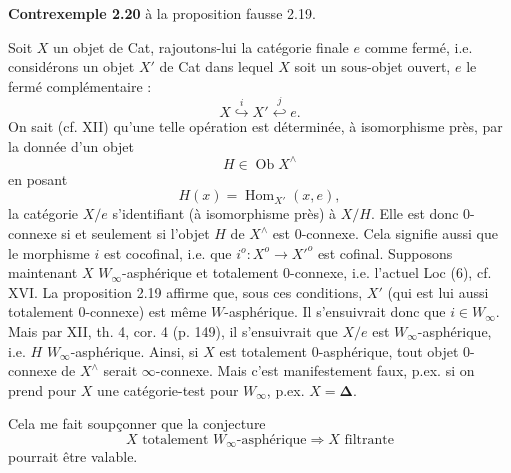 \documentclass[11pt]{article}
\newcommand{\printedpage}[1]{\marginpar{\footnotesize p.~#1}}
\newcommand{\msp}[1]{\marginpar{\footnotesize [#1]}}
\newcommand{\Hom}{\operatorname{Hom}}
\newcommand{\Ob}{\operatorname{Ob}}
\begin{document}
\msp{page 36bis}
\noindent\textbf{Contrexemple 2.20} à la proposition fausse 2.19.

Soit $X$ un objet de Cat, rajoutons-lui la catégorie finale $e$ comme fermé, i.e. considérons un objet $X'$ de Cat dans lequel $X$ soit un sous-objet ouvert, $e$ le fermé complémentaire :
\[
X \overset{i}{\hookrightarrow} X' \overset{j}{\hookleftarrow} e.
\]
On sait (cf. XII) qu'une telle opération est déterminée, à isomorphisme près, par la donnée d'un objet
\[
H \in \Ob X^\wedge
\]
en posant
\[
H(x) = \Hom_{X'}(x,e),
\]
la catégorie $X/e$ s'identifiant (à isomorphisme près) à $X/H$. Elle est donc 0-connexe si et seulement si l'objet $H$ de $X^\wedge$ est 0-connexe. Cela signifie aussi que le morphisme $i$ est cocofinal, i.e. que $i^o : X^o \longrightarrow X'^o$ est cofinal. Supposons maintenant $X$ $W_\infty$-asphérique et totalement 0-connexe, i.e. l'actuel Loc (6), cf. XVI. La proposition 2.19 affirme que, sous ces conditions, $X'$ (qui est lui aussi totalement 0-connexe) est même $W$-asphérique. Il s'ensuivrait donc que $i \in W_\infty$. Mais par XII, th. 4, cor. 4 (p. 149), il s'ensuivrait que
\printedpage{23}
\msp{page 36ter}
$X/e$ est $W_\infty$-asphérique, i.e. $H$ $W_\infty$-asphérique. Ainsi, si $X$ est totalement 0-asphérique, tout objet 0-connexe de $X^\wedge$ serait $\infty$-connexe. Mais c'est manifestement faux, p.ex. si on prend pour $X$ une catégorie-test pour $W_\infty$, p.ex. $X = \boldsymbol{\Delta}$.

Cela me fait soupçonner que la conjecture
\[
X \text{ totalement } W_\infty\text{-asphérique} \Longrightarrow X \text{ filtrante}
\]
pourrait être valable.
\end{document}
